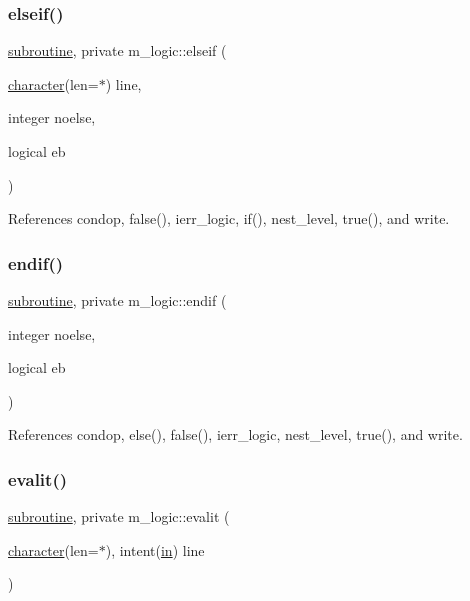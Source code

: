 \subsubsection{\texorpdfstring{elseif()}{elseif()}}
{\footnotesize\ttfamily \hyperlink{M__stopwatch_83_8txt_acfbcff50169d691ff02d4a123ed70482}{subroutine}, private m\+\_\+logic\+::elseif (\begin{DoxyParamCaption}\item[{\hyperlink{option__stopwatch_83_8txt_abd4b21fbbd175834027b5224bfe97e66}{character}(len=$\ast$)}]{line,  }\item[{integer}]{noelse,  }\item[{logical}]{eb }\end{DoxyParamCaption})\hspace{0.3cm}{\ttfamily [private]}}



References condop, false(), ierr\+\_\+logic, if(), nest\+\_\+level, true(), and write.

\mbox{\label{namespacem__logic_a60ae51929ab2f5d32f2a8f7e07e6debc}} 
\subsubsection{\texorpdfstring{endif()}{endif()}}
{\footnotesize\ttfamily \hyperlink{M__stopwatch_83_8txt_acfbcff50169d691ff02d4a123ed70482}{subroutine}, private m\+\_\+logic\+::endif (\begin{DoxyParamCaption}\item[{integer}]{noelse,  }\item[{logical}]{eb }\end{DoxyParamCaption})\hspace{0.3cm}{\ttfamily [private]}}



References condop, else(), false(), ierr\+\_\+logic, nest\+\_\+level, true(), and write.

\mbox{\label{namespacem__logic_aa03730fb0581290fa8c776b633430584}} 
\subsubsection{\texorpdfstring{evalit()}{evalit()}}
{\footnotesize\ttfamily \hyperlink{M__stopwatch_83_8txt_acfbcff50169d691ff02d4a123ed70482}{subroutine}, private m\+\_\+logic\+::evalit (\begin{DoxyParamCaption}\item[{\hyperlink{option__stopwatch_83_8txt_abd4b21fbbd175834027b5224bfe97e66}{character}(len=$\ast$), intent(\hyperlink{M__journal_83_8txt_afce72651d1eed785a2132bee863b2f38}{in})}]{line }\end{DoxyParamCaption})\hspace{0.3cm}{\ttfamily [private]}}



